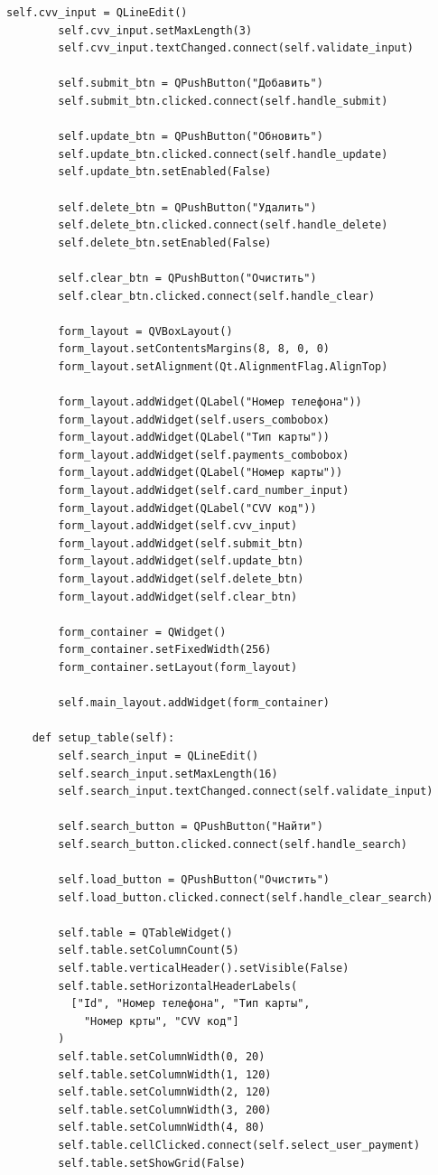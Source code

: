 \documentclass[a4paper,14pt]{extarticle}
\begin{document}
\begin{Verbatim}[tabsize=4,fontsize=\small]
        self.cvv_input = QLineEdit()
        self.cvv_input.setMaxLength(3)
        self.cvv_input.textChanged.connect(self.validate_input)

        self.submit_btn = QPushButton("Добавить")
        self.submit_btn.clicked.connect(self.handle_submit)

        self.update_btn = QPushButton("Обновить")
        self.update_btn.clicked.connect(self.handle_update)
        self.update_btn.setEnabled(False)

        self.delete_btn = QPushButton("Удалить")
        self.delete_btn.clicked.connect(self.handle_delete)
        self.delete_btn.setEnabled(False)

        self.clear_btn = QPushButton("Очистить")
        self.clear_btn.clicked.connect(self.handle_clear)

        form_layout = QVBoxLayout()
        form_layout.setContentsMargins(8, 8, 0, 0)
        form_layout.setAlignment(Qt.AlignmentFlag.AlignTop)

        form_layout.addWidget(QLabel("Номер телефона"))
        form_layout.addWidget(self.users_combobox)
        form_layout.addWidget(QLabel("Тип карты"))
        form_layout.addWidget(self.payments_combobox)
        form_layout.addWidget(QLabel("Номер карты"))
        form_layout.addWidget(self.card_number_input)
        form_layout.addWidget(QLabel("CVV код"))
        form_layout.addWidget(self.cvv_input)
        form_layout.addWidget(self.submit_btn)
        form_layout.addWidget(self.update_btn)
        form_layout.addWidget(self.delete_btn)
        form_layout.addWidget(self.clear_btn)

        form_container = QWidget()
        form_container.setFixedWidth(256)
        form_container.setLayout(form_layout)

        self.main_layout.addWidget(form_container)

    def setup_table(self):
        self.search_input = QLineEdit()
        self.search_input.setMaxLength(16)
        self.search_input.textChanged.connect(self.validate_input)

        self.search_button = QPushButton("Найти")
        self.search_button.clicked.connect(self.handle_search)

        self.load_button = QPushButton("Очистить")
        self.load_button.clicked.connect(self.handle_clear_search)

        self.table = QTableWidget()
        self.table.setColumnCount(5)
        self.table.verticalHeader().setVisible(False)
        self.table.setHorizontalHeaderLabels(
          ["Id", "Номер телефона", "Тип карты", 
            "Номер крты", "CVV код"]
        )
        self.table.setColumnWidth(0, 20)
        self.table.setColumnWidth(1, 120)
        self.table.setColumnWidth(2, 120)
        self.table.setColumnWidth(3, 200)
        self.table.setColumnWidth(4, 80)
        self.table.cellClicked.connect(self.select_user_payment)
        self.table.setShowGrid(False)


\end{Verbatim}
\end{document}
